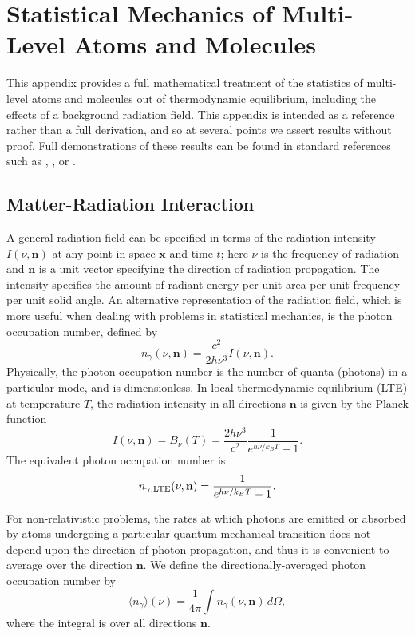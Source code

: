 \chapter{Statistical Mechanics of Multi-Level Atoms and Molecules}
\label{app:multilevel_atoms}

This appendix provides a full mathematical treatment of the statistics of multi-level atoms and molecules out of thermodynamic equilibrium, including the effects of a background radiation field. This appendix is intended as a reference rather than a full derivation, and so at several points we assert results without proof. Full demonstrations of these results can be found in standard references such as \citet{rybicki86a}, \citet{shu91a}, or \citet{draine11a}.

\section{Matter-Radiation Interaction}

A general radiation field can be specified in terms of the radiation intensity $I(\nu, \mathbf{n})$ at any point in space $\mathbf{x}$ and time $t$; here $\nu$ is the frequency of radiation and $\mathbf{n}$ is a unit vector specifying the direction of radiation propagation. The intensity specifies the amount of radiant energy per unit area per unit frequency per unit solid angle. An alternative representation of the radiation field, which is more useful when dealing with problems in statistical mechanics, is the photon occupation number, defined by
\begin{equation}
n_\gamma(\nu, \mathbf{n}) = \frac{c^2}{2h\nu^3} I(\nu, \mathbf{n}).
\end{equation}
Physically, the photon occupation number is the number of quanta (photons) in a particular mode, and is dimensionless. In local thermodynamic equilibrium (LTE) at temperature $T$, the radiation intensity in all directions $\mathbf{n}$ is given by the Planck function
\begin{equation}
I(\nu,\mathbf{n}) = B_\nu(T) = \frac{2h\nu^3}{c^2}\frac{1}{e^{h\nu/k_B T} - 1}.
\end{equation}
The equivalent photon occupation number is
\begin{equation}
\label{eq:ngamma_LTE}
n_{\gamma,\rm LTE}(\nu,\mathbf{n}) = \frac{1}{e^{h\nu/k_B T} - 1}.
\end{equation}

For non-relativistic problems, the rates at which photons are emitted or absorbed by atoms undergoing a particular quantum mechanical transition does not depend upon the direction of photon propagation, and thus it is convenient to average over the direction $\mathbf{n}$. We define the directionally-averaged photon occupation number by
\begin{equation}
\langle n_\gamma\rangle(\nu) = \frac{1}{4\pi} \int n_\gamma(\nu, \mathbf{n}) \, d\Omega,
\end{equation}
where the integral is over all directions $\mathbf{n}$.

